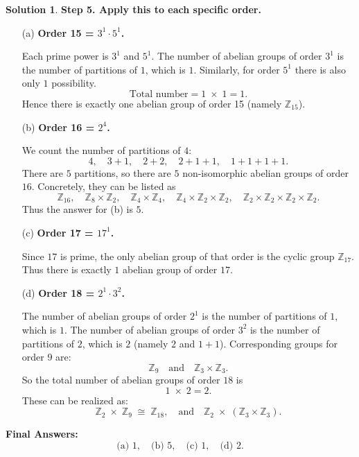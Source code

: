 \documentclass[12pt]{article}
\theoremstyle{definition} %
\newtheorem{solution}{Solution}
\theoremstyle{plain} %
\begin{document}
\begin{solution}
\bigskip

\noindent
\textbf{Step 5. Apply this to each specific order.}

\begin{enumerate}
\item[(a)] \textbf{Order 15 = $3^1 \cdot 5^1$.}

Each prime power is $3^1$ and $5^1$.  The number of abelian groups of order $3^1$ is the number of partitions of $1$, which is $1$.  Similarly, for order $5^1$ there is also only $1$ possibility.  
\[
\text{Total number} = 1 \;\times\; 1 = 1.
\]
Hence there is exactly one abelian group of order 15 (namely $\mathbb{Z}_{15}$).

\bigskip

\item[(b)] \textbf{Order 16 = $2^4$.}

We count the number of partitions of $4$:
\[
4,\quad 3 + 1,\quad 2 + 2,\quad 2 + 1 + 1,\quad 1 + 1 + 1 + 1.
\]
There are $5$ partitions, so there are $5$ non-isomorphic abelian groups of order $16$.  Concretely, they can be listed as
\[
\mathbb{Z}_{16}, \quad
\mathbb{Z}_8 \times \mathbb{Z}_2, \quad
\mathbb{Z}_4 \times \mathbb{Z}_4, \quad
\mathbb{Z}_4 \times \mathbb{Z}_2 \times \mathbb{Z}_2, \quad
\mathbb{Z}_2 \times \mathbb{Z}_2 \times \mathbb{Z}_2 \times \mathbb{Z}_2.
\]
Thus the answer for (b) is $5$.

\bigskip

\item[(c)] \textbf{Order 17 = $17^1$.}

Since $17$ is prime, the only abelian group of that order is the cyclic group $\mathbb{Z}_{17}$.  Thus there is exactly $1$ abelian group of order $17$.

\bigskip

\item[(d)] \textbf{Order 18 = $2^1 \cdot 3^2$.}

The number of abelian groups of order $2^1$ is the number of partitions of $1$, which is $1$.  
The number of abelian groups of order $3^2$ is the number of partitions of $2$, which is $2$ (namely $2$ and $1+1$).  Corresponding groups for order $9$ are:
\[
\mathbb{Z}_9 \quad \text{and} \quad \mathbb{Z}_3 \times \mathbb{Z}_3.
\]
So the total number of abelian groups of order $18$ is
\[
1 \;\times\; 2 = 2.
\]
These can be realized as:
\[
\mathbb{Z}_2 \;\times\; \mathbb{Z}_9 \;\cong\; \mathbb{Z}_{18}, 
\quad\text{and}\quad
\mathbb{Z}_2 \;\times\; (\mathbb{Z}_3 \times \mathbb{Z}_3).
\]

\end{enumerate}

\bigskip

\noindent
\textbf{Final Answers:}
\[
\text{(a) }1, \quad
\text{(b) }5, \quad
\text{(c) }1, \quad
\text{(d) }2.
\]   
\end{solution}
\end{document}
